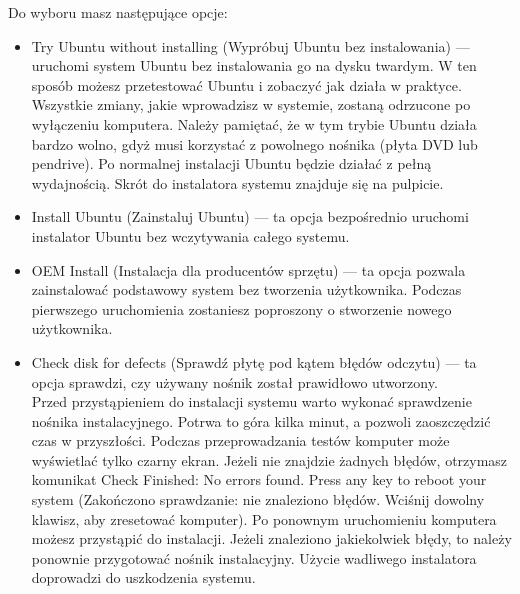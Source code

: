 \noindent Do wyboru masz następujące opcje:
\begin{itemize}
\item \textcolor{ubuntu_orange}{Try Ubuntu without installing (Wypróbuj Ubuntu bez instalowania)} --- uruchomi system Ubuntu bez instalowania go na dysku twardym. W ten sposób możesz przetestować Ubuntu i zobaczyć jak działa w praktyce. Wszystkie zmiany, jakie wprowadzisz w systemie, zostaną odrzucone po wyłączeniu komputera. Należy pamiętać, że w tym trybie Ubuntu działa bardzo wolno, gdyż musi korzystać z powolnego nośnika (płyta DVD lub pendrive). Po normalnej instalacji Ubuntu będzie działać z pełną wydajnością. Skrót do instalatora systemu znajduje się na pulpicie.
\item \textcolor{ubuntu_orange}{Install Ubuntu (Zainstaluj Ubuntu)} --- ta opcja bezpośrednio uruchomi instalator Ubuntu bez wczytywania całego systemu.
\item \textcolor{ubuntu_orange}{OEM Install (Instalacja dla producentów sprzętu)} --- ta opcja pozwala zainstalować podstawowy system bez tworzenia użytkownika. Podczas pierwszego uruchomienia zostaniesz poproszony o stworzenie nowego użytkownika.
\item \textcolor{ubuntu_orange}{Check disk for defects (Sprawdź płytę pod kątem błędów odczytu)} --- ta opcja sprawdzi, czy używany nośnik został prawidłowo utworzony.\\
Przed przystąpieniem do instalacji systemu warto wykonać sprawdzenie nośnika instalacyjnego. Potrwa to góra kilka minut, a pozwoli zaoszczędzić czas w przyszłości. Podczas przeprowadzania testów komputer może wyświetlać tylko czarny ekran. Jeżeli nie znajdzie żadnych błędów, otrzymasz komunikat \textcolor{ubuntu_orange}{Check Finished: No errors found. Press any key to reboot your system (Zakończono sprawdzanie: nie znaleziono błędów. Wciśnij dowolny klawisz, aby zresetować komputer)}. Po ponownym uruchomieniu komputera możesz przystąpić do instalacji. Jeżeli znaleziono jakiekolwiek błędy, to należy ponownie przygotować nośnik instalacyjny. Użycie wadliwego instalatora doprowadzi do uszkodzenia systemu. 
\end{itemize}
\clearpage
